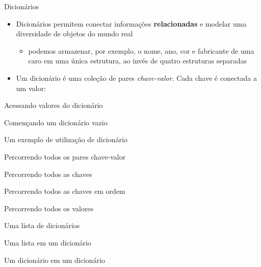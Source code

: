 \begin{frame}[t, fragile]{Dicionários}
  \begin{itemize}
      \item Dicionários permitem conectar informações {\bf relacionadas} e modelar uma diversidade de objetos do mundo real
      \begin{itemize}
      \item podemos armazenar, por exemplo, o nome, ano, cor e fabricante de uma caro em uma única estrutura, ao invés de quatro estruturas separadas
     \end{itemize}
     \item Um dicionário é uma coleção de pares {\it chave-valor}. Cada chave é conectada a um valor:
     
  \end{itemize}  
\end{frame}
%
\begin{frame}[t, fragile]{Acessando valores do dicionário}
  
\end{frame}
%
\begin{frame}[t, fragile]{Començando um dicionário vazio}
  
\end{frame}
%
\begin{frame}[t, fragile]{Um exemplo de utilização de dicionário}
  
\end{frame}
%
\begin{frame}[t, fragile]{Percorrendo todos os pares chave-valor}
  
\end{frame}
%
\begin{frame}[t, fragile]{Percorrendo todos as chaves}
  
\end{frame}
%
\begin{frame}[t, fragile]{Percorrendo todos as chaves em ordem}
  
\end{frame}
%
\begin{frame}[t, fragile]{Percorrendo todos os valores}
  
\end{frame}
%
\begin{frame}[t, fragile]{Uma lista de dicionários}
  
\end{frame}
%
\begin{frame}{Uma lista em um dicionário}
  
\end{frame}
%
\begin{frame}{Um dicionário em um dicionário}
  
\end{frame}
%


 